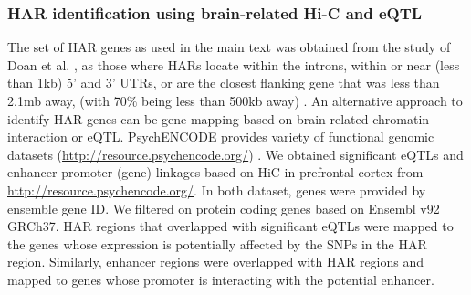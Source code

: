 \begin{refsection}
\subsubsection*{HAR identification using brain-related Hi-C and eQTL}
The set of HAR genes as used in the main text was obtained from the study of Doan et al. \citep{doan2016mutations}, as those where HARs locate within the introns, within or near (less than 1kb) 5' and 3' UTRs, or are the closest flanking gene that was less than 2.1mb away, (with 70$\%$  being less than 500kb away) \citep{doan2016mutations}. An alternative approach to identify HAR genes can be gene mapping based on brain related chromatin interaction or eQTL. PsychENCODE provides variety of functional genomic datasets (\href{http://resource.psychencode.org/}{http://resource.psychencode.org/}) \citep{wang2018comprehensive}. We obtained significant eQTLs and enhancer-promoter (gene) linkages based on HiC in prefrontal cortex from \href{http://resource.psychencode.org/}{http://resource.psychencode.org/}. In both dataset, genes were provided by ensemble gene ID. We filtered on protein coding genes based on Ensembl v92 GRCh37. HAR regions that overlapped with significant eQTLs were mapped to the genes whose expression is potentially affected by the SNPs in the HAR region. Similarly, enhancer regions were overlapped with HAR regions and mapped to genes whose promoter is interacting with the potential enhancer.


\end{refsection}
